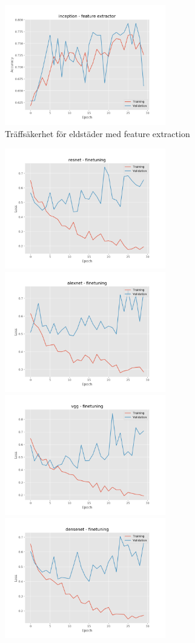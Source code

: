 \documentclass[]{kththesis}
\begin{document}
\begin{figure}[h]
    \includegraphics[width=7cm]{f_a_inception_fe}
    \caption{Träffsäkerhet för eldstäder med feature extraction}
    \label{fig:f_a_1}
  \end{figure}

  \begin{figure}[h]
    \includegraphics[width=7cm]{f_l_resnet_fine}
    \includegraphics[width=7cm]{f_l_alexnet_fine}
    \includegraphics[width=7cm]{f_l_vgg_fine}
    \includegraphics[width=7cm]{f_l_densenet_fine}

\end{figure}
\end{document}
